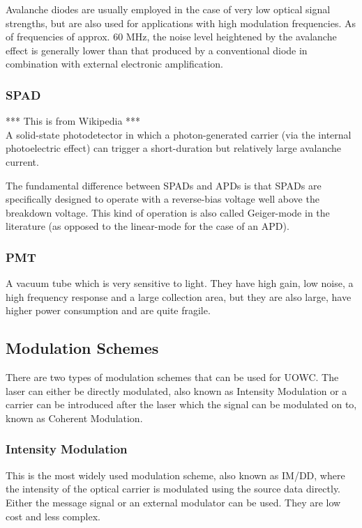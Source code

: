 Avalanche diodes are usually employed in the case of very low optical signal
strengths, but are also used for applications with high modulation frequencies.
As of frequencies of approx. 60 MHz, the noise level heightened by the
avalanche effect is generally lower than that produced by a conventional diode
in combination with external electronic amplification.

\subsubsection{\ac{SPAD}}
*** This is from Wikipedia ***\\
A solid-state photodetector in which a photon-generated carrier (via the
internal photoelectric effect) can trigger a short-duration but relatively
large avalanche current.

The fundamental difference between SPADs and APDs is that SPADs are
specifically designed to operate with a reverse-bias voltage well above the
breakdown voltage. This kind of operation is also called Geiger-mode in the
literature (as opposed to the linear-mode for the case of an APD).

\subsubsection{\ac{PMT}}
A vacuum tube which is very sensitive to light. They have high gain, low noise,
a high frequency response and a large collection area, but they are also large,
have higher power consumption and are quite fragile.

\subsection{Modulation Schemes}
There are two types of modulation schemes that can be used for \ac{UOWC}.
The laser can either be directly modulated, also known as Intensity Modulation
or a carrier can be introduced after the laser which the signal can be
modulated on to, known as Coherent Modulation.

\subsubsection{Intensity Modulation}
This is the most widely used modulation scheme, also known as \ac{IM/DD},
where the intensity of the optical carrier is modulated using the source
data directly. Either the message signal or an external modulator can be used. They are low cost and less complex.

